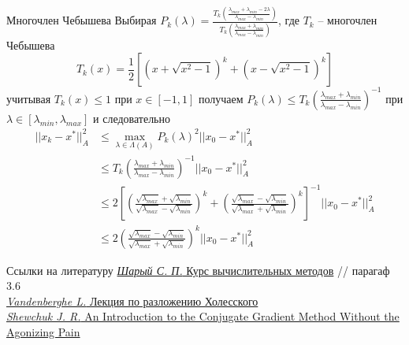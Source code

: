 \documentclass[10pt]{beamer}
\begin{document}
\begin{frame}{Многочлен Чебышева}
Выбирая $P_k(\lambda)=\frac{T_k\left(\frac{\lambda_{max}+\lambda_{min}-2\lambda}{\lambda_{max}-\lambda_{min}}\right)}{T_k\left(\frac{\lambda_{max}+\lambda_{min}}{\lambda_{max}-\lambda_{min}}\right)}$,
где $T_k$ -- многочлен Чебышева
$$
T_k(x)=\frac{1}{2}\left[(x+\sqrt{x^2-1})^k+(x-\sqrt{x^2-1})^k\right]
$$
учитывая $T_k(x)\leq 1$ при $x\in[-1, 1]$ получаем 
$P_k(\lambda)\leq T_k\left(\frac{\lambda_{max}+\lambda_{min}}{\lambda_{max}-\lambda_{min}}\right)^{-1}$ при $\lambda\in[\lambda_{min}, \lambda_{max}]$
\pause
и следовательно
\begin{align*}
||x_k-x^*||_A^2&\leq \max_{\lambda\in \Lambda(A)}P_k(\lambda)^2||x_0-x^*||^2_A\\
&\leq T_k\left(\frac{\lambda_{max}+\lambda_{min}}{\lambda_{max}-\lambda_{min}}\right)^{-1}||x_0-x^*||^2_A\\
&\leq 2\left[\left(\frac{\sqrt{\lambda_{max}}+\sqrt{\lambda_{min}} }{ \sqrt{\lambda_{max}}-
\sqrt{\lambda_{min}} }\right)^k+\left(\frac{\sqrt{\lambda_{max}}-\sqrt{\lambda_{min}} }{\sqrt{\lambda_{max}}+
\sqrt{\lambda_{min}} }\right)^k\right]^{-1}||x_0-x^*||^2_A\\
&\leq 2\left(\frac{\sqrt{\lambda_{max}}-\sqrt{\lambda_{min}} }{\sqrt{\lambda_{max}}+
\sqrt{\lambda_{min}} }\right)^k||x_0-x^*||^2_A
\end{align*}
\end{frame}

\begin{frame}{Ссылки на литературу}
\href{http://www.ict.nsc.ru/matmod/files/textbooks/SharyNuMeth.pdf}{\textit{Шарый С. П.} 
Курс вычислительных методов} // парагаф 3.6\\
\vspace{1em}
\href{http://www.seas.ucla.edu/~vandenbe/133A/lectures/chol.pdf}{\textit{Vandenberghe L.} Лекция по разложению Холесского} \\
\vspace{1em}
\href{https://www.cs.cmu.edu/~quake-papers/painless-conjugate-gradient.pdf}{\textit{Shewchuk J. R.} An Introduction to
the Conjugate Gradient Method
Without the Agonizing Pain} \\
\end{frame}
\end{document}
